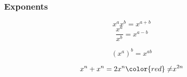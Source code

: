 \documentclass{beamer}
\begin{document}
\begin{frame} \frametitle{Exponents}
\[ x^{a}x^{b} = x^{a+b} \]
\[ \frac{x^a}{x^b} = x^{a-b} \]
\begin{expire}
\[(x^{a})^{b} = x^{ab}\]
\end{expire}
\[ x^n + x^n = 2x^n {\color{red} \neq} x^{2n} \]
\end{frame}
\end{document}
